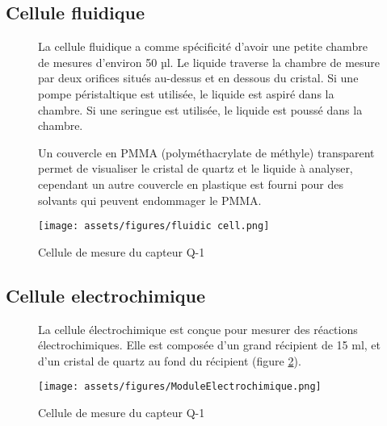 \subsection{Cellule fluidique}
\begin{figure}[H]
    \centering
    \begin{minipage}{0.48\textwidth}
        \small
        La cellule fluidique a comme spécificité d'avoir une petite chambre de mesures d'environ 50 µl.
        Le liquide traverse la chambre de mesure par deux orifices situés au-dessus et en dessous du cristal.
        Si une pompe péristaltique est utilisée, le liquide est aspiré dans la chambre.
        Si une seringue est utilisée, le liquide est poussé dans la chambre.

        Un couvercle en PMMA (polyméthacrylate de méthyle) transparent permet de visualiser le cristal de quartz et le liquide à analyser,
        cependant un autre couvercle en plastique est fourni pour des solvants qui peuvent endommager le PMMA.
    \end{minipage}\hfill
    \begin{minipage}{0.48\textwidth}
        \centering
        \texttt{[image: assets/figures/fluidic cell.png]}
        \caption{Cellule de mesure du capteur Q-1 \cite{manual-openqcmQ1}}
        \label{fig:cellule de mesure Q-1}
    \end{minipage}
\end{figure}
\subsection{Cellule electrochimique}

\begin{figure}[H]
    \centering
    \begin{minipage}{0.48\textwidth}
        \small
    La cellule électrochimique est conçue pour mesurer des réactions électrochimiques.
    Elle est composée d'un grand récipient de 15 ml, et d'un cristal de quartz au fond du récipient (figure \ref{fig:cellule electrolitique Q-1}).
    \end{minipage}\hfill
    \begin{minipage}{0.48\textwidth}
        \centering
        \texttt{[image: assets/figures/ModuleElectrochimique.png]}
        \caption{Cellule de mesure du capteur Q-1}
        \label{fig:cellule electrolitique Q-1}
    \end{minipage}
\end{figure}

